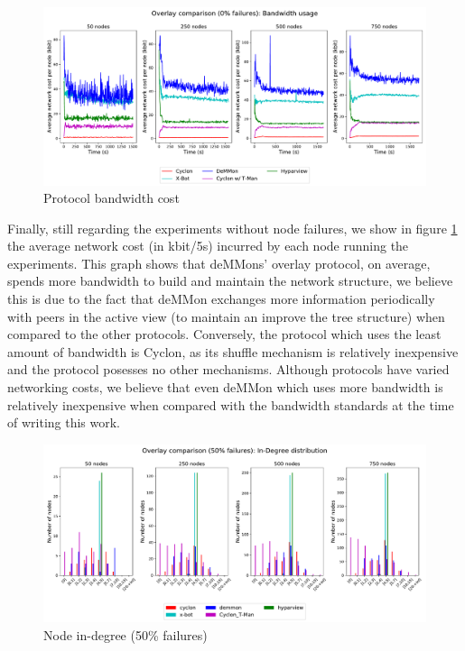 \begin{figure}
    \centering
    \includegraphics[width=\linewidth]{Chapters/evaluation/figures/membership/membership_bw_over_time_0_failures.pdf}
    \caption{Protocol bandwidth cost}
    \label{fig:overlay_proto_res_net_building:0_failures_BWUsage}
\end{figure}

Finally, still regarding the experiments without node failures, we show in figure \ref{fig:overlay_proto_res_net_building:0_failures_BWUsage} the average network cost (in kbit/5s) incurred by each node running the experiments. This graph shows that deMMons' overlay protocol, on average, spends more bandwidth to build and maintain the network structure, we believe this is due to the fact that deMMon exchanges more information periodically with peers in the active view (to maintain an improve the tree structure) when compared to the other protocols. Conversely, the protocol which uses the least amount of bandwidth is Cyclon, as its shuffle mechanism is relatively inexpensive and the protocol posesses no other mechanisms. Although protocols have varied networking costs, we believe that even deMMon which uses more bandwidth is relatively inexpensive when compared with the bandwidth standards at the time of writing this work.

\begin{figure}
    \centering
    \includegraphics[width=\linewidth]{Chapters/evaluation/figures/membership/membership_inDegree_50_failures.pdf}
    \caption{Node in-degree (50\% failures)}
    \label{fig:overlay_proto_res_net_building:50_failures_inDegree}
\end{figure}

